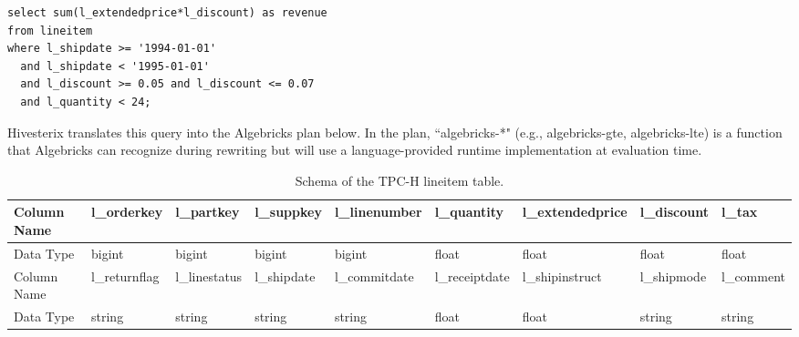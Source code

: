 \lstset{numbers=left, numberstyle=\tiny, stepnumber=1, numbersep=5pt}
\begin{center}
\scriptsize
\begin{lstlisting}
select sum(l_extendedprice*l_discount) as revenue
from lineitem
where l_shipdate >= '1994-01-01'
  and l_shipdate < '1995-01-01'
  and l_discount >= 0.05 and l_discount <= 0.07
  and l_quantity < 24;
\end{lstlisting}
\end{center}


Hivesterix translates this query into the Algebricks plan below. In the plan, ``algebricks-*" (e.g., algebricks-gte, algebricks-lte) is a function
that Algebricks can recognize during rewriting but will use a language-provided runtime implementation at evaluation time.

\begin{table}
\tiny
\begin{center}
\begin{tabular}{|l|l|l|l|l|l|l|l|l|}
\hline
Column Name &  l\_orderkey & l\_partkey & l\_suppkey & l\_linenumber & l\_quantity & l\_extendedprice & l\_discount & l\_tax\\ 
\hline
Data Type & bigint & bigint & bigint & bigint & float & float & float & float\\
\hline
\hline
Column Name & l\_returnflag & l\_linestatus & l\_shipdate & l\_commitdate & l\_receiptdate &l\_shipinstruct & l\_shipmode & l\_comment\\
\hline
Data Type & string & string & string & string & float & float & string & string\\
\hline
\end{tabular}
\caption{Schema of the TPC-H lineitem table.}\label{tbl:lineitemchema}
\end{center}
\end{table}


